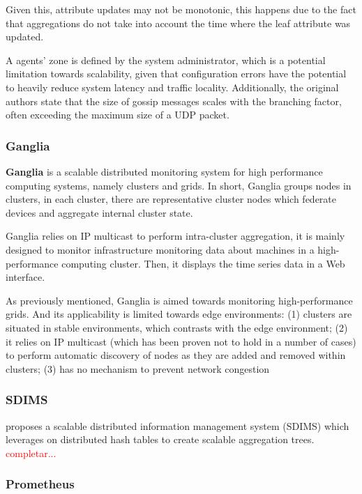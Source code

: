 Given this, attribute updates may not be monotonic, this happens due to the fact that aggregations do not take into account the time where the leaf attribute was updated. 

A agents' zone is defined by the system administrator, which is a potential limitation towards scalability, given that configuration errors have the potential to heavily reduce system latency and traffic locality. Additionally, the original authors state that the size of gossip messages scales with the branching factor, often exceeding the maximum size of a UDP packet. 

\subsubsection{Ganglia}

\textbf{Ganglia} is a scalable distributed monitoring system \cite{massie2004ganglia} for high performance computing systems, namely clusters and grids. In short, Ganglia groups nodes in clusters, in each cluster, there are representative cluster nodes which federate devices and aggregate internal cluster state.

Ganglia relies on IP multicast to perform intra-cluster aggregation, it is mainly designed to monitor infrastructure monitoring data about machines in a high-performance computing cluster. Then, it displays the time series data in a Web interface.

As previously mentioned, Ganglia is aimed towards monitoring high-performance 
grids. And its applicability is limited towards edge environments: (1) clusters are situated in stable environments, which contrasts with the edge environment; (2) it relies on IP multicast (which has been proven not to hold in a number of cases) to perform automatic discovery of nodes as they are added and removed within clusters; (3) has no mechanism to prevent network congestion 

\subsubsection{SDIMS}

\cite{10.1145/1030194.1015509} proposes a scalable distributed information management system (SDIMS) which leverages on distributed hash tables to create scalable aggregation trees. \textcolor{red}{completar...}

\subsubsection{Prometheus}

